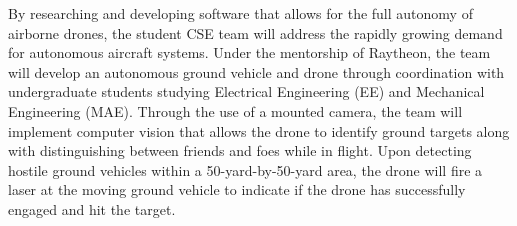 By researching and developing software that allows for the full autonomy of airborne drones, the student CSE team will address the rapidly growing demand for autonomous aircraft systems. Under the mentorship of Raytheon, the team will develop an autonomous ground vehicle and drone through coordination with undergraduate students studying Electrical Engineering (EE) and Mechanical Engineering (MAE). Through the use of a mounted camera, the team will implement computer vision that allows the drone to identify ground targets along with distinguishing between friends and foes while in flight. Upon detecting hostile ground vehicles within a 50-yard-by-50-yard area, the drone will fire a laser at the moving ground vehicle to indicate if the drone has successfully engaged and hit the target.